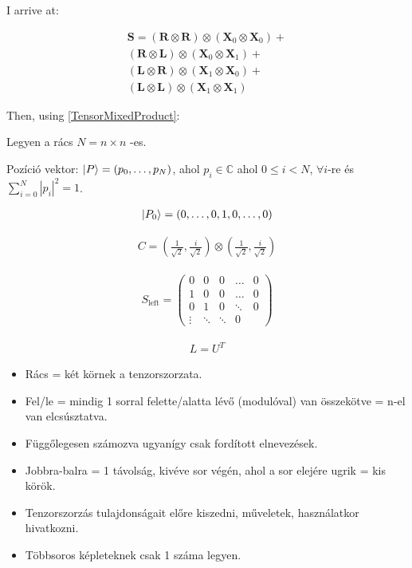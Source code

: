 I arrive at:

\begin{align*} 
    \mathbf{S} =   
    (\mathbf{R} \otimes \mathbf{R}) \otimes (\mathbf{X}_0 \otimes \mathbf{X}_0) + \\
    (\mathbf{R} \otimes \mathbf{L}) \otimes (\mathbf{X}_0 \otimes \mathbf{X}_1) + \\
    (\mathbf{L} \otimes \mathbf{R}) \otimes (\mathbf{X}_1 \otimes \mathbf{X}_0) + \\
    (\mathbf{L} \otimes \mathbf{L}) \otimes (\mathbf{X}_1 \otimes \mathbf{X}_1)\phantom{+}
\end{align*}

Then, using \hyperref[TensorMixedProduct]{[TensorMixedProduct]}:


Legyen a rács $N = n \times n$ -es.

Pozíció vektor: $\ket{P} =  (p_{0}, \dots, p_{N})$, ahol
$p_{i}\in\mathds{C}$ ahol $0 \leq{} i < N$, $\forall{}i$-re és $\sum\limits_{i=0}^{N} |p_i|^2 = 1$.

\begin{align}
  \ket{P_{0}} =  (0, \dots, 0, 1, 0, \dots, 0)
\end{align}

\begin{align}
  C = (\frac{1}{\sqrt{2}}, \frac{i}{\sqrt{2}}) \otimes (\frac{1}{\sqrt{2}}, \frac{i}{\sqrt{2}})
\end{align}

\begin{align}
  S_{\text{left}} =
  \begin{pmatrix}
    0      & 0      & 0      & \dots  & 0 \\
    1      & 0      & 0      & \dots  & 0 \\
    0      & 1      & 0      & \ddots & 0 \\
    \vdots & \ddots & \ddots & 0
  \end{pmatrix}
\end{align}


\begin{align}
  L = U^{T}
\end{align}


\begin{itemize}
  \item Rács = két körnek a tenzorszorzata.
  \item Fel/le = mindig 1 sorral felette/alatta lévő (modulóval) van összekötve = n-el van elcsúsztatva.
  \item Függőlegesen számozva ugyanígy csak fordított elnevezések.
  \item Jobbra-balra = 1 távolság, kivéve sor végén, ahol a sor elejére ugrik = kis körök.
  \item Tenzorszorzás tulajdonságait előre kiszedni, műveletek, használatkor hivatkozni.
  \item Többsoros képleteknek csak 1 száma legyen.
\end{itemize}

